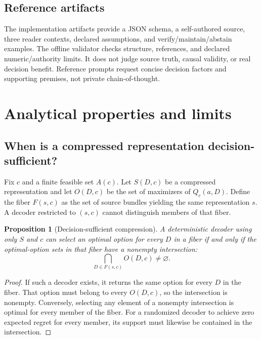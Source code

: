 \documentclass[11pt]{article}
\newtheorem{proposition}{Proposition}
\begin{document}
\subsection{Reference artifacts}

The implementation artifacts provide a JSON schema, a self-authored source, three reader contexts, declared assumptions, and verify/maintain/abstain examples. The offline validator checks structure, references, and declared numeric/authority limits. It does not judge source truth, causal validity, or real decision benefit. Reference prompts request concise decision factors and supporting premises, not private chain-of-thought.

\section{Analytical properties and limits}

\subsection{When is a compressed representation decision-sufficient?}

Fix $c$ and a finite feasible set $A(c)$. Let $S(D,c)$ be a compressed representation and let $O(D,c)$ be the set of maximizers of $Q_c(a,D)$. Define the fiber $F(s,c)$ as the set of source bundles yielding the same representation $s$. A decoder restricted to $(s,c)$ cannot distinguish members of that fiber.

\begin{proposition}[Decision-sufficient compression]

A deterministic decoder using only $S$ and $c$ can select an optimal option for every $D$ in a fiber if and only if the optimal-option sets in that fiber have a nonempty intersection:
\[
\bigcap_{D\in F(s,c)} O(D,c)\neq\varnothing.
\]

\end{proposition}

\begin{proof}

If such a decoder exists, it returns the same option for every $D$ in the fiber. That option must belong to every $O(D,c)$, so the intersection is nonempty. Conversely, selecting any element of a nonempty intersection is optimal for every member of the fiber. For a randomized decoder to achieve zero expected regret for every member, its support must likewise be contained in the intersection.

\end{proof}
\end{document}
